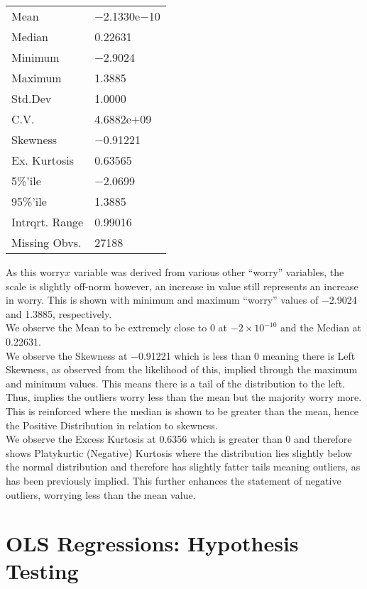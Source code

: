 \documentclass[11pt, english]{article}
\begin{document}
	\begin{tabular}{ll}
		Mean & $-$2.1330e$-$10\\
		Median & 0.22631\\
		Minimum & $-$2.9024\\
		Maximum & 1.3885\\
		Std.Dev & 1.0000\\
		C.V. & 4.6882e$+$09\\
		Skewness & $-$0.91221\\
		Ex. Kurtosis & 0.63565\\
		5\%'ile & $-$2.0699\\
		95\%'ile & 1.3885\\
		Intrqrt. Range & 0.99016\\
		Missing Obvs. & 27188\\
	\end{tabular}

	As this worry$x$ variable was derived from various other ``worry'' variables, the scale is slightly off-norm however, an increase in value still represents an increase in worry. This is shown with minimum and maximum ``worry'' values of $-$2.9024 and 1.3885, respectively.\\

	We observe the Mean to be extremely close to 0 at $-2\times{10}^{-10}$ and the Median at 0.22631.\\

	We observe the Skewness at $-$0.91221 which is less than 0 meaning there is Left Skewness, as observed from the likelihood of this, implied through the maximum and minimum values. This means there is a tail of the distribution to the left. Thus, implies the outliers worry less than the mean but the majority worry more. This is reinforced where the median is shown to be greater than the mean, hence the Positive Distribution in relation to skewness.\\

	We observe the Excess Kurtosis at 0.6356 which is greater than 0 and therefore shows Platykurtic (Negative) Kurtosis where the distribution lies slightly below the normal distribution and therefore has slightly fatter tails meaning outliers, as has been previously implied. This further enhances the statement of negative outliers, worrying less than the mean value.

\newpage

\section{OLS Regressions: Hypothesis Testing}
\end{document}
